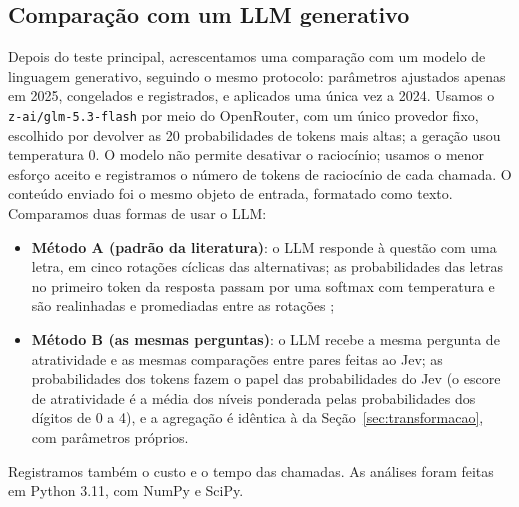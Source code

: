 \subsection{Comparação com um LLM generativo}\label{sec:llm}

Depois do teste principal, acrescentamos uma comparação com um modelo de linguagem generativo, seguindo o mesmo protocolo: parâmetros ajustados apenas em 2025, congelados e registrados, e aplicados uma única vez a 2024. Usamos o \texttt{z-ai/glm-5.3-flash} por meio do OpenRouter, com um único provedor fixo, escolhido por devolver as 20 probabilidades de tokens mais altas; a geração usou temperatura 0. O modelo não permite desativar o raciocínio; usamos o menor esforço aceito e registramos o número de tokens de raciocínio de cada chamada. O conteúdo enviado foi o mesmo objeto de entrada, formatado como texto. Comparamos duas formas de usar o LLM:
\begin{itemize}[nosep]
  \item \textbf{Método A (padrão da literatura)}: o LLM responde à questão com uma letra, em cinco rotações cíclicas das alternativas; as probabilidades das letras no primeiro token da resposta passam por uma softmax com temperatura e são realinhadas e promediadas entre as rotações \citep{saeuberli2025};
  \item \textbf{Método B (as mesmas perguntas)}: o LLM recebe a mesma pergunta de atratividade e as mesmas comparações entre pares feitas ao Jev; as probabilidades dos tokens fazem o papel das probabilidades do Jev (o escore de atratividade é a média dos níveis ponderada pelas probabilidades dos dígitos de 0 a 4), e a agregação é idêntica à da Seção~\ref{sec:transformacao}, com parâmetros próprios.
\end{itemize}
Registramos também o custo e o tempo das chamadas. As análises foram feitas em Python 3.11, com NumPy e SciPy.
